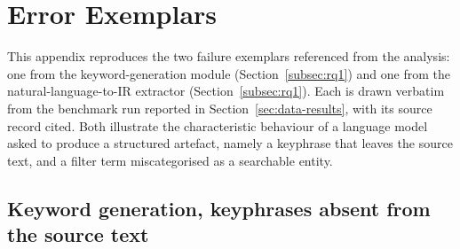 %
%

\section{Error Exemplars}
\label{app:errors}

This appendix reproduces the two failure exemplars referenced from the analysis:
one from the keyword-generation module (Section~\ref{subsec:rq1}) and one from the
natural-language-to-IR extractor (Section~\ref{subsec:rq1}). Each is drawn
verbatim from the benchmark run reported in Section~\ref{sec:data-results}, with
its source record cited. Both illustrate the characteristic behaviour of a
language model asked to produce a structured artefact, namely a keyphrase that
leaves the source text, and a filter term miscategorised as a searchable entity.

\subsection*{Keyword generation, keyphrases absent from the source text}

